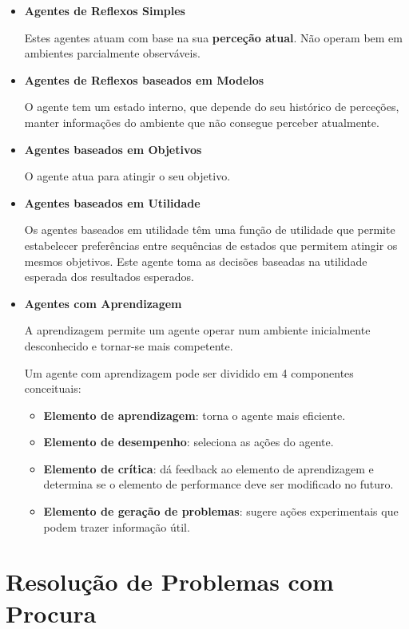 \documentclass[12pt]{article}
\begin{document}
\begin{itemize}
    \item \textbf{Agentes de Reflexos Simples}
    
    Estes agentes atuam com base na sua \textbf{perceção atual}. Não operam bem em ambientes parcialmente observáveis.

    \item \textbf{Agentes de Reflexos baseados em Modelos}
    
    O agente tem um estado interno, que depende do seu histórico de perceções, manter informações do ambiente que não consegue perceber atualmente.

    \item \textbf{Agentes baseados em Objetivos}
    
    O agente atua para atingir o seu objetivo.

    \item \textbf{Agentes baseados em Utilidade}
    
    Os agentes baseados em utilidade têm uma função de utilidade que permite estabelecer preferências entre sequências de estados que permitem atingir os mesmos objetivos. Este agente toma as decisões baseadas na utilidade esperada dos resultados esperados.

    \item \textbf{Agentes com Aprendizagem}
    
    A aprendizagem permite um agente operar num ambiente inicialmente desconhecido e tornar-se mais competente. 

    Um agente com aprendizagem pode ser dividido em 4 componentes conceituais:
    \begin{itemize}[topsep=0pt, itemsep=0pt]
        \item \textbf{Elemento de aprendizagem}: torna o agente mais eficiente.
        \item \textbf{Elemento de desempenho}: seleciona as ações do agente.
        \item \textbf{Elemento de crítica}: dá feedback ao elemento de aprendizagem  e determina se o elemento de performance deve ser modificado no futuro.
        \item \textbf{Elemento de geração de problemas}: sugere ações experimentais que podem trazer informação útil.
    \end{itemize}
\end{itemize}

\newpage

\section{Resolução de Problemas com Procura}
\end{document}
